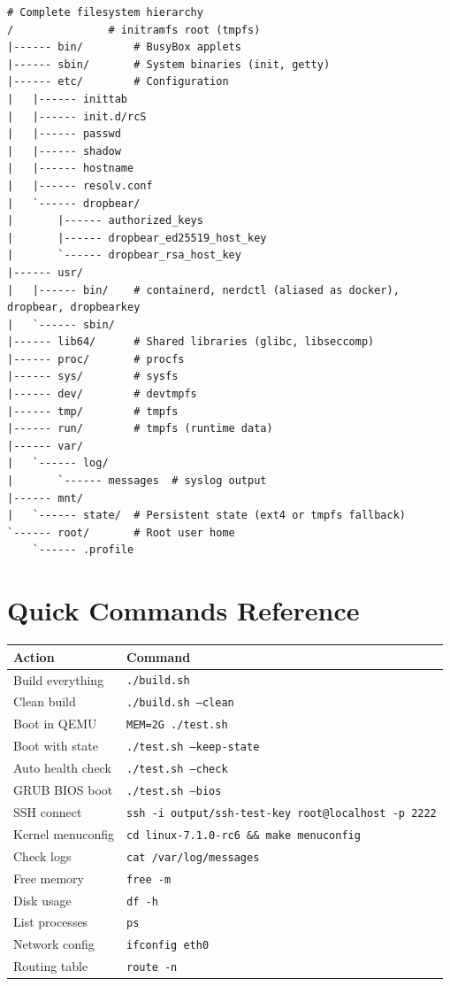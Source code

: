 \begin{lstlisting}
# Complete filesystem hierarchy
/               # initramfs root (tmpfs)
|------ bin/        # BusyBox applets
|------ sbin/       # System binaries (init, getty)
|------ etc/        # Configuration
|   |------ inittab
|   |------ init.d/rcS
|   |------ passwd
|   |------ shadow
|   |------ hostname
|   |------ resolv.conf
|   `------ dropbear/
|       |------ authorized_keys
|       |------ dropbear_ed25519_host_key
|       `------ dropbear_rsa_host_key
|------ usr/
|   |------ bin/    # containerd, nerdctl (aliased as docker), dropbear, dropbearkey
|   `------ sbin/
|------ lib64/      # Shared libraries (glibc, libseccomp)
|------ proc/       # procfs
|------ sys/        # sysfs
|------ dev/        # devtmpfs
|------ tmp/        # tmpfs
|------ run/        # tmpfs (runtime data)
|------ var/
|   `------ log/
|       `------ messages  # syslog output
|------ mnt/
|   `------ state/  # Persistent state (ext4 or tmpfs fallback)
`------ root/       # Root user home
    `------ .profile
\end{lstlisting}

\section{Quick Commands Reference}

\begin{longtable}{|p{5cm}|p{8cm}|}
\hline
\textbf{Action} & \textbf{Command} \\
\hline
Build everything & \texttt{./build.sh} \\
Clean build & \texttt{./build.sh --clean} \\
Boot in QEMU & \texttt{MEM=2G ./test.sh} \\
Boot with state & \texttt{./test.sh --keep-state} \\
Auto health check & \texttt{./test.sh --check} \\
GRUB BIOS boot & \texttt{./test.sh --bios} \\
SSH connect & \texttt{ssh -i output/ssh-test-key root@localhost -p 2222} \\
Kernel menuconfig & \texttt{cd linux-7.1.0-rc6 \&\& make menuconfig} \\
Check logs & \texttt{cat /var/log/messages} \\
Free memory & \texttt{free -m} \\
Disk usage & \texttt{df -h} \\
List processes & \texttt{ps} \\
Network config & \texttt{ifconfig eth0} \\
Routing table & \texttt{route -n} \\
\hline
\end{longtable}
